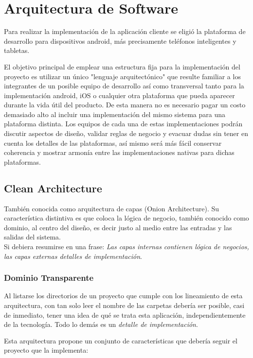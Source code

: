 \section{Arquitectura de Software}

Para realizar la implementación de la aplicación cliente se eligió la plataforma de desarrollo para dispositivos android, más precisamente teléfonos inteligentes y tabletas.

El objetivo principal de emplear una estructura fija para la implementación del proyecto es utilizar un único "lenguaje arquitectónico" que resulte familiar a los integrantes de un posible equipo de desarrollo así como transversal tanto para la implementación android, iOS o cualquier otra plataforma que pueda aparecer durante la vida útil del producto. De esta manera no es necesario pagar un costo demasiado alto al incluir una implementación del mismo sistema para una plataforma distinta. 
Los equipos de cada una de estas implementaciones podrán discutir aspectos de diseño, validar reglas de negocio y evacuar dudas sin tener en cuenta los detalles de las plataformas, así mismo será más fácil conservar coherencia y mostrar armonía entre las implementaciones nativas para dichas plataformas.

\subsection{Clean Architecture}
También conocida como arquitectura de capas (Onion Architecture). Su característica distintiva es que coloca la lógica de negocio, también conocido como dominio, al centro del diseño, es decir justo al medio entre las entradas y las salidas del sistema\cite{clean_bob}.\\
Si debiera resumirse en una frase: \textit{Las capas internas contienen lógica de negocios, las capas externas detalles de implementación}.

\subsubsection{Dominio Transparente}
Al listarse los directorios de un proyecto que cumple con los lineamiento de esta arquitectura, con tan solo leer el nombre de las carpetas debería ser posible, casi de inmediato, tener una idea de qué se trata esta aplicación, independientemente de la tecnología. Todo lo demás es un \emph{detalle de implementación}\cite{clean_five}.

Esta arquitectura propone un conjunto de características que debería seguir el proyecto que la implementa:

